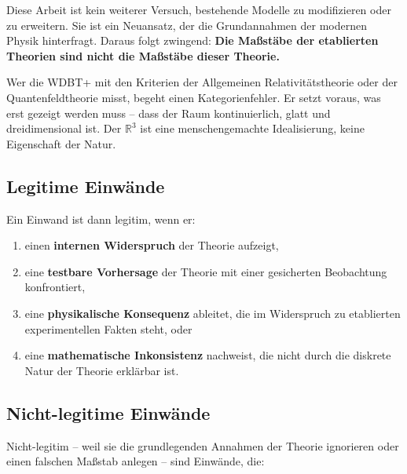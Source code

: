 Diese Arbeit ist kein weiterer Versuch, bestehende Modelle zu modifizieren oder zu erweitern. Sie ist ein Neuansatz, der die Grundannahmen der modernen Physik hinterfragt. Daraus folgt zwingend: \textbf{Die Maßstäbe der etablierten Theorien sind nicht die Maßstäbe dieser Theorie.}

Wer die WDBT+ mit den Kriterien der Allgemeinen Relativitätstheorie oder der Quantenfeldtheorie misst, begeht einen Kategorienfehler. Er setzt voraus, was erst gezeigt werden muss – dass der Raum kontinuierlich, glatt und dreidimensional ist. Der \( \mathbb{R}^3 \) ist eine menschengemachte Idealisierung, keine Eigenschaft der Natur.

\subsection{Legitime Einwände}
\label{sub:legitime_einwaende}

Ein Einwand ist dann legitim, wenn er:

\begin{enumerate}
    \item einen \textbf{internen Widerspruch} der Theorie aufzeigt,
    \item eine \textbf{testbare Vorhersage} der Theorie mit einer gesicherten Beobachtung konfrontiert,
    \item eine \textbf{physikalische Konsequenz} ableitet, die im Widerspruch zu etablierten experimentellen Fakten steht, oder
    \item eine \textbf{mathematische Inkonsistenz} nachweist, die nicht durch die diskrete Natur der Theorie erklärbar ist.
\end{enumerate}

\subsection{Nicht-legitime Einwände}
\label{sub:nicht_legitime_einwaende}

Nicht-legitim – weil sie die grundlegenden Annahmen der Theorie ignorieren oder einen falschen Maßstab anlegen – sind Einwände, die:

